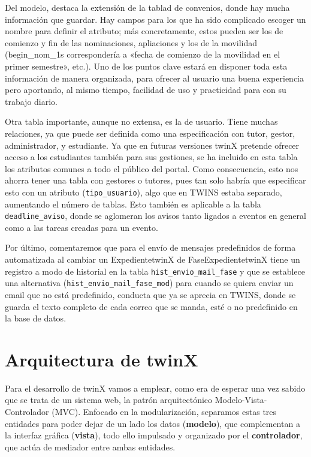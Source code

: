 Del modelo, destaca la extensión de la tablad de convenios, donde hay mucha información que guardar. Hay campos para los que ha sido complicado escoger un nombre para definir el atributo; más concretamente, estos pueden ser los de comienzo y fin de las nominaciones, apliaciones y los de la movilidad (begin\_nom\_1s correspondería a «fecha de comienzo de la movilidad en el primer semestre», etc.). Uno de los puntos clave estará en disponer toda esta información de manera organizada, para ofrecer al usuario una buena experiencia pero aportando, al mismo tiempo, facilidad de uso y practicidad para con su trabajo diario.

Otra tabla importante, aunque no extensa, es la de usuario. Tiene muchas relaciones, ya que puede ser definida como una especificación con tutor, gestor, administrador, y estudiante. Ya que en futuras versiones twinX pretende ofrecer acceso a los estudiantes también para sus gestiones, se ha incluido en esta tabla los atributos comunes a todo el público del portal. Como consecuencia, esto nos ahorra tener una tabla con gestores o tutores, pues tan solo habría que especificar esto con un atributo (\texttt{tipo\_usuario}), algo que en TWINS estaba separado, aumentando el número de tablas. Esto también es aplicable a la tabla \texttt{deadline\_aviso}, donde se aglomeran los avisos tanto ligados a eventos en general como a las tareas creadas para un evento.

Por último, comentaremos que para el envío de mensajes predefinidos de forma automatizada al cambiar un \gls{ExpedientetwinX} de \gls{FaseExpedientetwinX} tiene un registro a modo de historial en la tabla \texttt{hist\_envio\_mail\_fase} y que se establece una alternativa (\texttt{hist\_envio\_mail\_fase\_mod}) para cuando se quiera enviar un email que no está predefinido, conducta que ya se aprecia en TWINS, donde se guarda el texto completo de cada correo que se manda, esté o no predefinido en la base de datos.

\section{Arquitectura de twinX}

Para el desarrollo de twinX vamos a emplear, como era de esperar una vez sabido que se trata de un sistema web, la patrón arquitectónico Modelo-Vista-Controlador (MVC). Enfocado en la modularización, separamos estas tres entidades para poder dejar de un lado los datos (\textbf{modelo}), que complementan a la interfaz gráfica (\textbf{vista}), todo ello impulsado y organizado por el \textbf{controlador}, que actúa de mediador entre ambas entidades.

